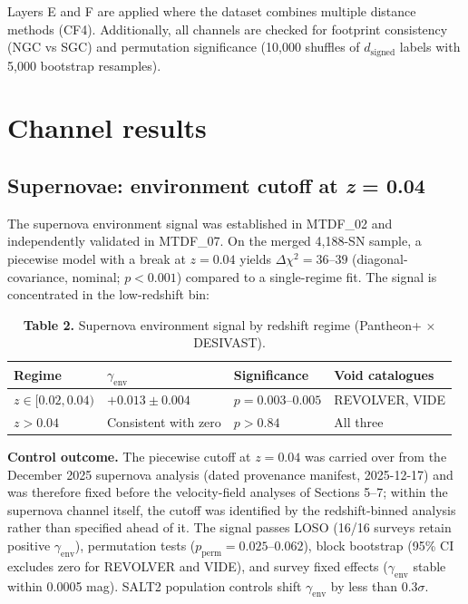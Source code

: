 \documentclass[11pt,a4paper]{article}
\begin{document}
Layers E and F are applied where the dataset combines multiple distance methods (CF4). Additionally, all channels are checked for footprint consistency (NGC vs SGC) and permutation significance (10,000 shuffles of \(d_\mathrm{signed}\) labels with 5,000 bootstrap resamples).

\section{Channel results}
\label{sec:sec5}

\subsection{Supernovae: environment cutoff at \emph{z} = 0.04}
The supernova environment signal was established in MTDF\_\allowbreak{}02 and independently validated in MTDF\_\allowbreak{}07. On the merged 4,188-SN sample, a piecewise model with a break at \(z = 0.04\) yields \(\Delta\chi^2 = 36\text{--}39\) (diagonal-covariance, nominal; \(p < 0.001\)) compared to a single-regime fit. The signal is concentrated in the low-redshift bin:

\begin{table}[H]
\centering
\footnotesize
\caption{\textbf{Table 2.} Supernova environment signal by redshift regime (Pantheon+ $\times$ DESIVAST).}
\begin{tabularx}{\linewidth}{l>{\RaggedRight\arraybackslash}X>{\RaggedRight\arraybackslash}X>{\RaggedRight\arraybackslash}X}
\toprule
\textbf{Regime} & \textbf{\(\gamma_\mathrm{env}\)} & \textbf{Significance} & \textbf{Void catalogues} \tabularnewline
\midrule
\(z \in [0.02, 0.04)\) & \(+0.013 \pm 0.004\) & \(p = 0.003\text{--}0.005\) & REVOLVER, VIDE \tabularnewline
\(z > 0.04\) & Consistent with zero & \(p > 0.84\) & All three \tabularnewline
\bottomrule
\end{tabularx}
\end{table}

\begin{mdframed}[linecolor=accent,linewidth=0.5pt,backgroundcolor=callout-bg,leftline=true,rightline=true,topline=true,bottomline=true,innerleftmargin=8pt,innerrightmargin=8pt,innertopmargin=6pt,innerbottommargin=6pt]
\textbf{Control outcome.} The piecewise cutoff at \(z = 0.04\) was carried over from the December 2025 supernova analysis (dated provenance manifest, 2025-12-17) and was therefore fixed before the velocity-field analyses of Sections 5--7; within the supernova channel itself, the cutoff was identified by the redshift-binned analysis rather than specified ahead of it. The signal passes LOSO (16/\allowbreak{}16 surveys retain positive \(\gamma_\mathrm{env}\)), permutation tests (\(p_\mathrm{perm} = 0.025\text{--}0.062\)), block bootstrap (95\% CI excludes zero for REVOLVER and VIDE), and survey fixed effects (\(\gamma_\mathrm{env}\) stable within 0.0005 mag). SALT2 population controls shift \(\gamma_\mathrm{env}\) by less than 0.3\(\sigma\).
\end{mdframed}
\end{document}
